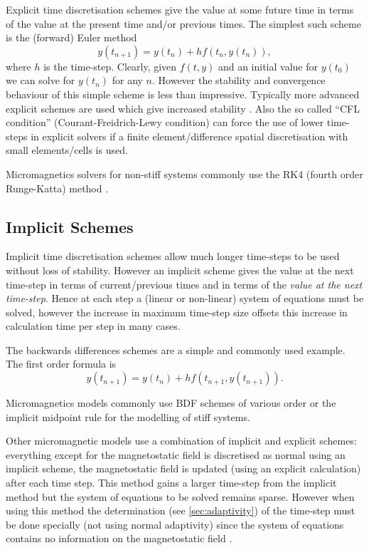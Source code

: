 Explicit time discretisation schemes give the value at some future time in terms of the value at the present time and/or previous times. The simplest such scheme is the (forward) Euler method
\begin{equation}
  \label{eq:44}
  y(t_{n+1}) = y(t_n) + h f(t_n,y(t_n)),
\end{equation}
where $h$ is the time-step. 
Clearly, given $f(t,y)$ and an initial value for $y(t_0)$ we can solve for $y(t_n)$ for any $n$. However the stability and convergence behaviour of this simple scheme is less than impressive. Typically more advanced explicit schemes are used which give increased stability \cite{Atkinson2009}.
Also the so called ``CFL condition'' (Courant-Freidrich-Lewy condition) can force the use of lower time-steps in explicit solvers if a finite element/difference spatial discretisation with small elements/cells is used.

Micromagnetics solvers for non-stiff systems commonly use the RK4 (fourth order Runge-Katta) method \cite{Suess2002}.


\subsection{Implicit Schemes}
\label{sec:implicit-schemes}

Implicit time discretisation schemes allow much longer time-steps to be used without loss of stability.
However an implicit scheme gives the value at the next time-step in terms of current/previous times and in terms of the \emph{value at the next time-step}.
Hence at each step a (linear or non-linear) system of equations must be solved, however the increase in maximum time-step size offsets this increase in calculation time per step in many cases.

The backwards differences schemes are a simple and commonly used example. The first order formula is
\begin{equation}
  \label{eq:48}
  y(t_{n+1}) = y(t_n) + hf(t_{n+1}, y(t_{n+1})).
\end{equation}

Micromagnetics models commonly use BDF schemes of various order \cite{Suess2002} or the implicit midpoint rule \cite{DAquino2005} for the modelling of stiff systems.

Other micromagnetic models use a combination of implicit and explicit schemes: everything except for the magnetostatic field is discretised as normal using an implicit scheme, the magnetostatic field is updated (using an explicit calculation) after each time step. 
This method gains a larger time-step from the implicit method but the system of equations to be solved remains sparse.
However when using this method the determination (see \autoref{sec:adaptivity}) of the time-step must be done specially (\ie not using normal adaptivity) since the system of equations contains no information on the magnetostatic field \cite{Schrefl1997}.




